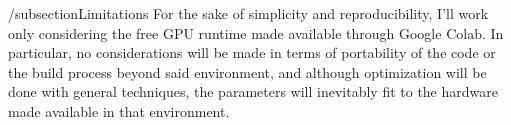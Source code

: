 /subsection{Limitations}
For the sake of simplicity and reproducibility, I'll work only considering the free GPU runtime made available through Google Colab. In particular, no considerations will be made in terms of portability of the code or the build process beyond said environment, and although optimization will be done with general techniques, the parameters will inevitably fit to the hardware made available in that environment.